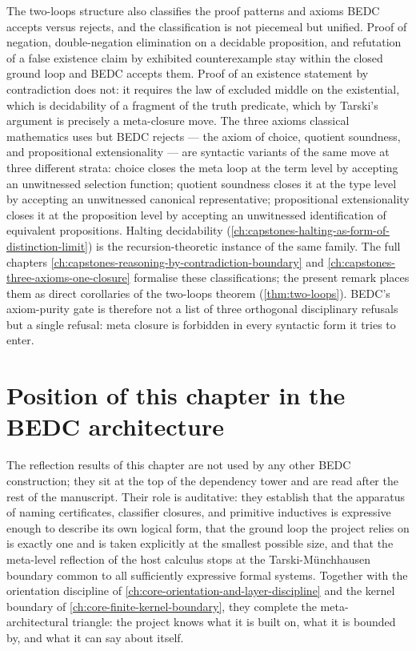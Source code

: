 \begin{remark}
\label{rem:reasoning-and-axioms-as-meta-closure}
The two-loops structure also classifies the proof patterns and axioms BEDC accepts versus rejects, and the classification is not piecemeal but unified. Proof of negation, double-negation elimination on a decidable proposition, and refutation of a false existence claim by exhibited counterexample stay within the closed ground loop and BEDC accepts them. Proof of an existence statement by contradiction does not: it requires the law of excluded middle on the existential, which is decidability of a fragment of the truth predicate, which by Tarski's argument is precisely a meta-closure move. The three axioms classical mathematics uses but BEDC rejects --- the axiom of choice, quotient soundness, and propositional extensionality --- are syntactic variants of the same move at three different strata: choice closes the meta loop at the term level by accepting an unwitnessed selection function; quotient soundness closes it at the type level by accepting an unwitnessed canonical representative; propositional extensionality closes it at the proposition level by accepting an unwitnessed identification of equivalent propositions. Halting decidability (\autoref{ch:capstones-halting-as-form-of-distinction-limit}) is the recursion-theoretic instance of the same family. The full chapters \autoref{ch:capstones-reasoning-by-contradiction-boundary} and \autoref{ch:capstones-three-axioms-one-closure} formalise these classifications; the present remark places them as direct corollaries of the two-loops theorem (\autoref{thm:two-loops}). BEDC's axiom-purity gate is therefore not a list of three orthogonal disciplinary refusals but a single refusal: meta closure is forbidden in every syntactic form it tries to enter.
\end{remark}

\section{Position of this chapter in the BEDC architecture}
\label{sec:reflection-position}

The reflection results of this chapter are not used by any other BEDC construction; they sit at the top of the dependency tower and are read after the rest of the manuscript. Their role is auditative: they establish that the apparatus of naming certificates, classifier closures, and primitive inductives is expressive enough to describe its own logical form, that the ground loop the project relies on is exactly one and is taken explicitly at the smallest possible size, and that the meta-level reflection of the host calculus stops at the Tarski-M\"unchhausen boundary common to all sufficiently expressive formal systems. Together with the orientation discipline of \autoref{ch:core-orientation-and-layer-discipline} and the kernel boundary of \autoref{ch:core-finite-kernel-boundary}, they complete the meta-architectural triangle: the project knows what it is built on, what it is bounded by, and what it can say about itself.

